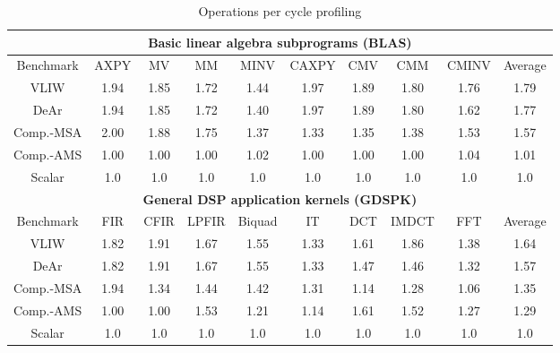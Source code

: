 \begin{table}[h]%
\centering%
\caption{Operations per cycle profiling}%
\label{tab:opc}%
\resizebox{\columnwidth}{!}%
{%
\begin{tabular}{|c|c|c|c|c|c|c|c|c|c|}%
\hline
\multicolumn{10}{|c|}{\textbf{Basic linear algebra subprograms (BLAS)}} \\ \hline
Benchmark  &  AXPY  &  MV  &  MM  &  MINV  &  CAXPY  &  CMV  &  CMM  &  CMINV  &  Average \\ \hline 
VLIW  &   1.94  &   1.85  &   1.72  &   1.44  &   1.97  &   1.89  &   1.80  &   1.76  &   1.79     \\ \hline 
DeAr  &   1.94  &   1.85  &   1.72  &   1.40  &   1.97  &   1.89  &   1.80  &   1.62  &   1.77     \\ \hline
Comp.-MSA  &   2.00  &   1.88  &   1.75  &   1.37  &   1.33  &   1.35  &   1.38  &   1.53  &   1.57     \\ \hline 
Comp.-AMS  &   1.00  &   1.00  &   1.00  &   1.02  &   1.00  &   1.00  &   1.00  &   1.04  &   1.01     \\ \hline 
Scalar  & 1.0  & 1.0  & 1.0  & 1.0  & 1.0  & 1.0  & 1.0  & 1.0  & 1.0 \\ \hline 
\multicolumn{10}{|c|}{\textbf{General DSP application kernels (GDSPK)}}                     \\ \hline
Benchmark  &  FIR  &  CFIR  &  LPFIR  &  Biquad  &  IT  &  DCT  &  IMDCT  &  FFT  &  Average \\ \hline 
        VLIW  &   1.82  &   1.91  &   1.67  &   1.55  &   1.33  &   1.61  &   1.86  &   1.38  &   1.64     \\ \hline 
        DeAr  &   1.82  &   1.91  &   1.67  &   1.55  &   1.33  &   1.47  &   1.46  &   1.32  &   1.57     \\ \hline 
        Comp.-MSA  &   1.94  &   1.34  &   1.44  &   1.42  &   1.31  &   1.14  &   1.28  &   1.06  &   1.35     \\ \hline 
        Comp.-AMS  &   1.00  &   1.00  &   1.53  &   1.21  &   1.14  &   1.61  &   1.52  &   1.27  &   1.29     \\ \hline 
        Scalar  & 1.0  & 1.0  & 1.0  & 1.0  & 1.0  & 1.0  & 1.0  & 1.0  & 1.0 \\ \hline 
    \end{tabular}%
}%
\end{table}%
